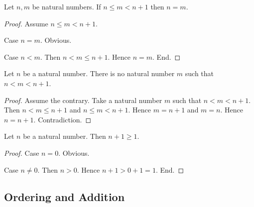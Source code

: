 \documentclass[10pt]{article}
\begin{document}
  \begin{forthel}
    \begin{proposition}
      Let $n, m$ be natural numbers.
      If $n \leq m < n + 1$ then $n = m$.
    \end{proposition}
    \begin{proof}
      Assume $n \leq m < n + 1$.

      Case $n = m$. Obvious.

      Case $n < m$.
        Then $n < m \leq n + 1$.
        Hence $n = m$.
      End.
    \end{proof}
  \end{forthel}

  \begin{forthel}
    \begin{corollary}
      Let $n$ be a natural number.
      There is no natural number $m$ such that $n < m < n + 1$.
    \end{corollary}
    \begin{proof}
      Assume the contrary.
      Take a natural number $m$ such that $n < m < n + 1$.
      Then $n < m \leq n + 1$ and $n \leq m < n + 1$.
      Hence $m = n + 1$ and $m = n$.
      Hence $n = n + 1$.
      Contradiction.
    \end{proof}
  \end{forthel}

  \begin{forthel}
    \begin{proposition}
      Let $n$ be a natural number.
      Then $n + 1 \geq 1$.
    \end{proposition}
    \begin{proof}
      Case $n = 0$. Obvious.

      Case $n \neq 0$.
        Then $n > 0$.
        Hence $n + 1 > 0 + 1 = 1$.
      End.
    \end{proof}
  \end{forthel}


  \subsection*{Ordering and Addition}
\end{document}
